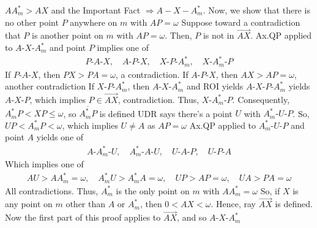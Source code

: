 \documentclass{report}
\begin{document}
\begin{itemize}
            \( AA_m^* > AX \) and the Important Fact \(\Rightarrow A - X - A_m^* \).
            \bigbreak \noindent 
            Now, we show that there is no other point $P$ anywhere on $m$ with $AP = \omega$
            \bigbreak \noindent 
            Suppose toward a contradiction that $P$ is another point on $m$ with $AP = \omega$. Then, $P$ is not in $\overrightarrow{AX}$.
            \bigbreak \noindent 
            Ax.QP applied to $ A\text{-}X\text{-}A^{*}_{m}$ and point $P$ implies one of 
            \begin{align*}
                P\text{-}A\text{-}X, \quad A\text{-}P\text{-}X, \quad X\text{-}P\text{-}A_{m}^{*}, \quad X\text{-}A^{*}_{m}\text{-}P
            \end{align*}
            If $ P\text{-}A\text{-}X$, then $PX > PA = \omega$, a contradiction.
            \bigbreak \noindent 
            If $ A\text{-}P\text{-}X$, then $ AX > AP = \omega$, another contradiction
            \bigbreak \noindent 
            If $ X\text{-}P\text{-}A_{m}^{*} $, then $ A\text{-}X\text{-}A_{m}^{*}$ and ROI yields $ A\text{-}X\text{-}P\text{-}A_{m}^{*}$ yields $ A\text{-}X\text{-}P$, which implies $P \in \overrightarrow{AX}$, contradiction.
            \bigbreak \noindent 
            Thus, $ X\text{-}A_{m}^{*}\text{-}P$. Consequently, $A_{m}^{*}P < XP \leq \omega$, so $\overline{A_{m}^{*}P} $ is defined
            \bigbreak \noindent 
            UDR says there's a point $U$ with $A_{m}^{*}\text{-}U\text{-}P$. So, $UP < A_{m}^{*}P < \omega$, which implies $U \ne A$ as $AP = \omega$
            \bigbreak \noindent 
            Ax.QP applied to $ A_{m}^{*}\text{-}U\text{-}P$ and point $A$ yields one of 
            \begin{align*}
                A\text{-}A_{m}^{*}\text{-}U, \quad A_{m}^{*}\text{-}A\text{-}U, \quad U\text{-}A\text{-}P, \quad U\text{-}P\text{-}A
            \end{align*}
            Which implies one of 
            \begin{align*}
                AU>AA_{m}^{*} = \omega ,\quad A_{m}^{*}U > A_{m}^{*}A = \omega, \quad UP > AP = \omega, \quad UA > PA = \omega
            \end{align*}
            All contradictions. Thus, $A_{m}^{*}$ is the only point on $m$ with $AA_{m}^{*} = \omega$
            \bigbreak \noindent 
            So, if $X$ is any point on $m$ other than $A$ or $A_{m}^{*}$, then $0 < AX < \omega$. Hence, ray $\overrightarrow{AX} $ is defined.
            \bigbreak \noindent 
            Now the first part of this proof applies to $ \overrightarrow{AX}$, and so $ A\text{-}X\text{-}A_{m}^{*}$

\end{itemize}
\end{document}
